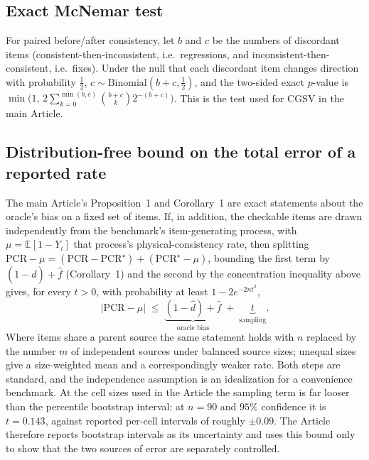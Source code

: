 \documentclass[11pt,a4paper]{article}
\begin{document}
\subsection{Exact McNemar test}
For paired before/after consistency, let $b$ and $c$ be the numbers of discordant items
(consistent-then-inconsistent, i.e.\ regressions, and inconsistent-then-consistent,
i.e.\ fixes). Under the null that each discordant item changes direction with
probability $\tfrac12$, $c\sim\mathrm{Binomial}(b+c,\tfrac12)$, and the two-sided exact
$p$-value is $\min\!\big(1,\,2\sum_{k=0}^{\min(b,c)}\binom{b+c}{k}2^{-(b+c)}\big)$. This
is the test used for CGSV in the main Article.
\subsection{Distribution-free bound on the total error of a reported rate}
The main Article's Proposition~1 and Corollary~1 are exact statements about the oracle's
bias on a fixed set of items. If, in addition, the checkable items are drawn independently
from the benchmark's item-generating process, with
$\mu=\mathbb{E}[1-Y_i]$ that process's physical-consistency rate, then splitting
$\mathrm{PCR}-\mu=(\mathrm{PCR}-\mathrm{PCR}^\star)+(\mathrm{PCR}^\star-\mu)$, bounding the
first term by $(1-\hat d)+\hat f$ (Corollary~1) and the second by the concentration
inequality above gives, for every $t>0$, with probability at least $1-2e^{-2nt^2}$,
\[
|\mathrm{PCR}-\mu|\;\le\;\underbrace{(1-\hat d)+\hat f}_{\text{oracle bias}}\;+\;\underbrace{t}_{\text{sampling}}.
\]
Where items share a parent source the same statement holds with $n$ replaced by the number
$m$ of independent sources under balanced source sizes; unequal sizes give a size-weighted
mean and a correspondingly weaker rate. Both steps are standard, and the independence
assumption is an idealization for a convenience benchmark. At the cell sizes used in the
Article the sampling term is far looser than the percentile bootstrap interval: at $n=90$ and
$95\%$ confidence it is $t=0.143$, against reported per-cell intervals of roughly $\pm0.09$.
The Article therefore reports bootstrap intervals as its uncertainty and uses this bound only
to show that the two sources of error are separately controlled.

\clearpage
\end{document}
